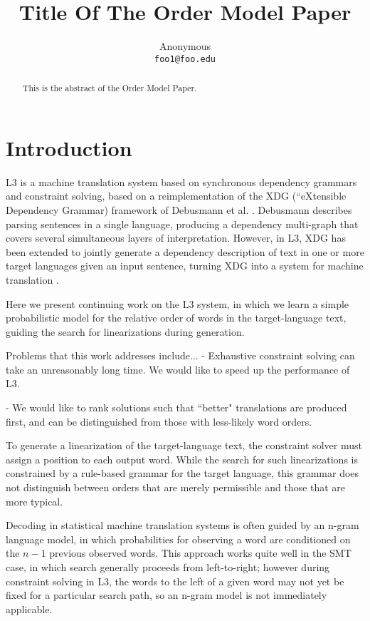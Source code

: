 \documentclass[11pt]{article}
\title{Title Of The Order Model Paper}
\author{Anonymous \\
  {\tt foo1@foo.edu} }
\begin{document}
\maketitle

\begin{abstract}
This is the abstract of the Order Model Paper.
\end{abstract}

\section{Introduction}
L3 is a machine translation system based on synchronous dependency grammars and
constraint solving, based on a reimplementation of the XDG (``eXtensible
Dependency Grammar) framework of Debusmann et al.
\cite{debusmann-EtAl:2004:COLING}. Debusmann describes parsing sentences in a
single language, producing a dependency multi-graph that covers several
simultaneous layers of interpretation. However, in L3, XDG has been extended to
jointly generate a dependency description of text in one or more target
languages given an input sentence, turning XDG into a system for machine
translation \cite{gasser:2011:FreeRBMT}.

Here we present continuing work on the L3 system, in which we learn a simple
probabilistic model for the relative order of words in the target-language
text, guiding the search for linearizations during generation.


Problems that this work addresses include...
- Exhaustive constraint solving can take an unreasonably long time. We would
like to speed up the performance of L3.

- We would like to rank solutions such that ``better" translations are produced
first, and can be distinguished from those with less-likely word orders.

To generate a linearization of the target-language text, the constraint solver
must assign a position to each output word. While the search for such
linearizations is constrained by a rule-based grammar for the target language,
this grammar does not distinguish between orders that are merely permissible
and those that are more typical.


Decoding in statistical machine translation systems is often guided by an
n-gram language model, in which probabilities for observing a word are
conditioned on the $n-1$ previous observed words. This approach works quite
well in the SMT case, in which search generally proceeds from left-to-right;
however during constraint solving in L3, the words to the left of a given word
may not yet be fixed for a particular search path, so an n-gram model is not
immediately applicable.
\end{document}
